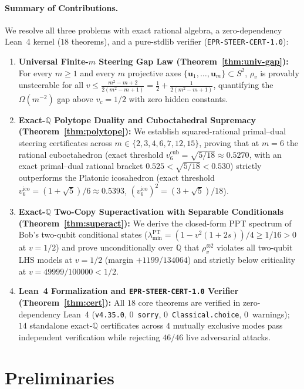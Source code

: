 \documentclass[11pt,a4paper]{article}
\theoremstyle{definition}
\theoremstyle{remark}
\newcommand{\QQ}{\mathbb{Q}}
\newcommand{\certschema}{\texttt{EPR-STEER-CERT-1.0}}
\begin{document}
\paragraph{Summary of Contributions.}
We resolve all three problems with exact rational algebra, a zero-dependency Lean~4 kernel ($18$ theorems), and a pure-stdlib verifier (\certschema{}):
\begin{enumerate}[leftmargin=1.8em,itemsep=2pt]
  \item \textbf{Universal Finite-$m$ Steering Gap Law (Theorem~\ref{thm:univ-gap}):} For every $m \ge 1$ and every $m$ projective axes $\{\mathbf{u}_1,\dots,\mathbf{u}_m\} \subset S^2$, $\rho_v$ is provably unsteerable for all $v \le \frac{m^2-m+2}{2(m^2-m+1)} = \frac{1}{2} + \frac{1}{2(m^2-m+1)}$, quantifying the $\Omega(m^{-2})$ gap above $v_c = 1/2$ with zero hidden constants.
  \item \textbf{Exact-$\QQ$ Polytope Duality and Cuboctahedral Supremacy (Theorem~\ref{thm:polytope}):} We establish squared-rational primal--dual steering certificates across $m \in \{2,3,4,6,7,12,15\}$, proving that at $m=6$ the rational cuboctahedron (exact threshold $v_6^{\mathrm{cub}} = \sqrt{5/18} \approx 0.5270$, with an exact primal--dual rational bracket $0.525 < \sqrt{5/18} < 0.530$) strictly outperforms the Platonic icosahedron (exact threshold $v_6^{\mathrm{ico}} = (1+\sqrt{5})/6 \approx 0.5393$, $(v_6^{\mathrm{ico}})^2 = (3+\sqrt{5})/18$).
  \item \textbf{Exact-$\QQ$ Two-Copy Superactivation with Separable Conditionals (Theorem~\ref{thm:superact}):} We derive the closed-form PPT spectrum of Bob's two-qubit conditional states ($\lambda_{\min}^{\mathrm{PT}} = (1 - v^2(1+2s))/4 \ge 1/16 > 0$ at $v=1/2$) and prove unconditionally over $\QQ$ that $\rho_v^{\otimes 2}$ violates all two-qubit LHS models at $v = 1/2$ (margin $+1199/134064$) and strictly below criticality at $v = 49999/100000 < 1/2$.
  \item \textbf{Lean~4 Formalization and \certschema{} Verifier (Theorem~\ref{thm:cert}):} All $18$ core theorems are verified in zero-dependency Lean~4 (\texttt{v4.35.0}, $0$~\texttt{sorry}, $0$~\texttt{Classical.choice}, $0$~warnings); $14$ standalone exact-$\QQ$ certificates across $4$ mutually exclusive modes pass independent verification while rejecting $46/46$ live adversarial attacks.
\end{enumerate}

\section{Preliminaries}
\end{document}
